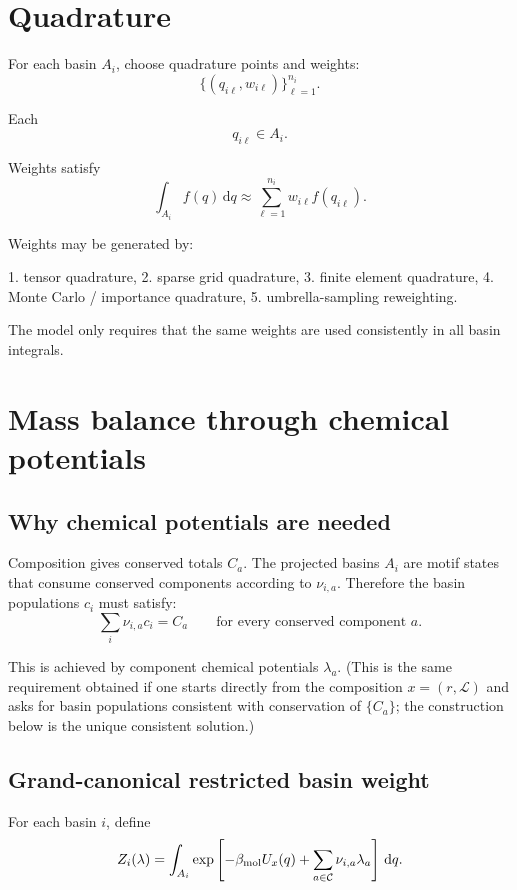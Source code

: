\documentclass[11pt]{article}
\newcommand{\dd}{\,\mathrm d}
\begin{document}
\section{Quadrature}
\label{sec:quadrature}

For each basin \(A_i\), choose quadrature points and weights:
\[
\{(q_{i\ell},w_{i\ell})\}_{\ell=1}^{n_i}.
\]

Each
\[
q_{i\ell}\in A_i.
\]

Weights satisfy
\[
\int_{A_i} f(q)\dd q
\approx
\sum_{\ell=1}^{n_i}w_{i\ell}f(q_{i\ell}).
\]

Weights may be generated by:

1. tensor quadrature,
2. sparse grid quadrature,
3. finite element quadrature,
4. Monte Carlo / importance quadrature,
5. umbrella-sampling reweighting.

The model only requires that the same weights are used consistently in all
basin integrals.

\section{Mass balance through chemical potentials}
\label{sec:massbalance}

\subsection{Why chemical potentials are needed}

Composition gives conserved totals \(C_a\). The projected basins \(A_i\) are
motif states that consume conserved components according to \(\nu_{i,a}\).
Therefore the basin populations \(c_i\) must satisfy:
\[
\sum_i\nu_{i,a}c_i=C_a
\qquad
\text{for every conserved component }a.
\]

This is achieved by component chemical potentials \(\lambda_a\). (This is the
same requirement obtained if one starts directly from the composition
\(x=(r,\mathcal L)\) and asks for basin populations consistent with
conservation of \(\{C_a\}\); the construction below is the unique consistent
solution.)

\subsection{Grand-canonical restricted basin weight}

For each basin \(i\), define
\[
Z_i(\lambda)
=
\int_{A_i}
\exp
\left[
-\beta_{\rm mol}U_x(q)
+
\sum_{a\in\mathcal C}\nu_{i,a}\lambda_a
\right]\dd q.
\]
\end{document}
